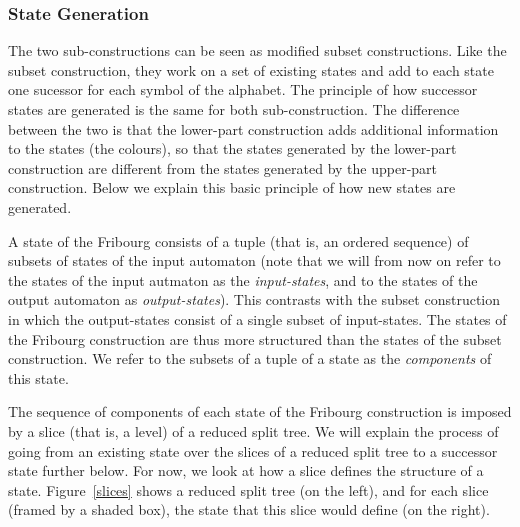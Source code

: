 \subsubsection{State Generation}
The two sub-constructions can be seen as modified subset constructions. Like the subset construction, they work on a set of existing states and add to each state one sucessor for each symbol of the alphabet. The principle of how successor states are generated is the same for both sub-construction. The difference between the two is that the lower-part construction adds additional information to the states (the colours), so that the states generated by the lower-part construction are different from the states generated by the upper-part construction. Below we explain this basic principle of how new states are generated.

A state of the Fribourg consists of a tuple (that is, an ordered sequence) of subsets of states of the input automaton (note that we will from now on refer to the states of the input autmaton as the \textit{input-states}, and to the states of the output automaton as \textit{output-states}). This contrasts with the subset construction in which the output-states consist of a single subset of input-states. The states of the Fribourg construction are thus more structured than the states of the subset construction. We refer to the subsets of a tuple of a state as the \textit{components} of this state.

The sequence of components of each state of the Fribourg construction is imposed by a slice (that is, a level) of a reduced split tree. We will explain the process of going from an existing state over the slices of a reduced split tree to a successor state further below. For now, we look at how a slice defines the structure of a state. Figure~\ref{slices} shows a reduced split tree (on the left), and for each slice (framed by a shaded box), the state that this slice would define (on the right).

